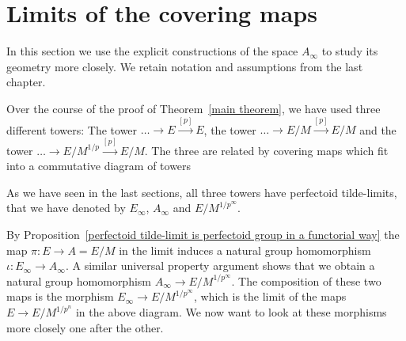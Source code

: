 \documentclass[10pt,oneside]{amsart}
\theoremstyle{definition}
\begin{document}
	
	\section{Limits of the covering maps}
	In this section we use the explicit constructions of the space $A_\infty$ to study its geometry more closely. We retain notation and assumptions from the last chapter.
	
	Over the course of the proof of Theorem~\ref{main theorem}, we have used three different towers: The tower $\dots \rightarrow E\xrightarrow{[p]} E$, the tower $\dots \rightarrow E/M \xrightarrow{[p]} E/M$ and the tower $\dots \rightarrow E/M^{1/p} \xrightarrow{[p]} E/M$. The three are related by covering maps which fit into a commutative diagram of towers
	\begin{center}
	\end{center}
	As we have seen in the last sections, all three towers have perfectoid tilde-limits, that we have denoted by $E_\infty$, $A_\infty$ and $E/M^{1/p^\infty}$.
	
	By Proposition~\ref{perfectoid tilde-limit is perfectoid group in a functorial way} the map $\pi:E\rightarrow A=E/M$ in the limit induces a natural group homomorphism $\iota:E_\infty \rightarrow A_\infty$. A similar universal property argument shows that we obtain a natural group homomorphism $A_\infty \rightarrow E/M^{1/p^\infty}$. The composition of these two maps is the morphism $E_\infty\rightarrow E/M^{1/p^\infty}$, which is the limit of the maps $E\rightarrow E/M^{1/p^n}$ in the above diagram.
	We now want to look at these morphisms more closely one after the other.
	
\end{document}
